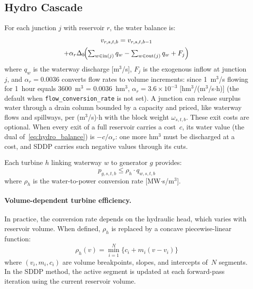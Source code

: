 \subsection{Hydro Cascade}
\label{sec:hydro}

For each junction $j$ with reservoir $r$, the water balance is:
\begin{multline}
\label{eq:hydro_balance}
v_{r,s,t,b} = v_{r,s,t,b-1} \\
  + \alpha_r \Delta_b \!\Bigl(
    \textstyle\sum_{w \in \text{in}(j)} q_{w}
    - \textstyle\sum_{w \in \text{out}(j)} q_{w}
    + F_j
  \Bigr)
\end{multline}
where $q_w$ is the waterway discharge [m$^3$/s], $F_j$ is the exogenous
inflow at junction $j$, and $\alpha_r = 0.0036$ converts flow rates to
volume increments: since 1~m$^3$/s flowing for 1~hour equals
3600~m$^3$ = 0.0036~hm$^3$, $\alpha_r = 3.6 \times 10^{-3}$
[hm$^3$/(m$^3$/s$\cdot$h)] (the default when \texttt{flow\_conversion\_rate}
is not set).  A junction can release surplus water through a drain
column bounded by a capacity and priced, like waterway flows and
spillways, per (m$^3$/s)$\cdot$h with the block weight
$\omega_{s,t,b}$.  These exit costs are optional.  When every exit of a
full reservoir carries a cost~$c$, its water value (the dual
of~\eqref{eq:hydro_balance}) is $-c/\alpha_r$: one more hm$^3$ must be
discharged at a cost, and SDDP carries such negative values through its
cuts.

Each turbine $h$ linking waterway $w$ to generator $g$ provides:
\begin{equation}
\label{eq:turbine}
p_{g,s,t,b} \leq \rho_h \cdot q_{w,s,t,b}
\end{equation}
where $\rho_h$ is the water-to-power conversion rate [MW$\cdot$s/m$^3$].

\paragraph{Volume-dependent turbine efficiency.}
In practice, the conversion rate depends on the hydraulic head, which
varies with reservoir volume.  When defined, $\rho_h$ is replaced by a
concave piecewise-linear function:
\begin{equation}
\label{eq:vol_efficiency}
\rho_h(v) = \min_{i=1}^{N}
  \bigl\{ c_i + m_i (v - v_i) \bigr\}
\end{equation}
where $(v_i, m_i, c_i)$ are volume breakpoints, slopes, and intercepts
of~$N$ segments.  In the SDDP method, the active segment is updated at
each forward-pass iteration using the current reservoir volume.

